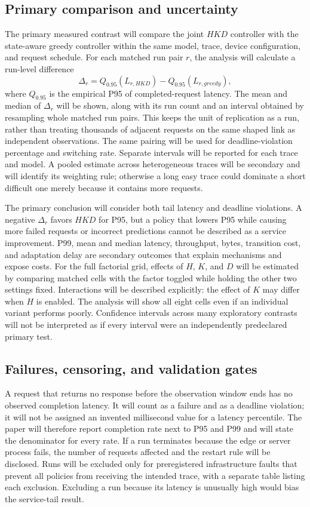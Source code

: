 \documentclass[10pt,a4paper,twocolumn]{article}
\begin{document}
\subsection{Primary comparison and uncertainty}
The primary measured contrast will compare the joint $HKD$ controller with the state-aware greedy controller within the same model, trace, device configuration, and request schedule. For each matched run pair $r$, the analysis will calculate a run-level difference
\begin{equation}
\Delta_r=Q_{0.95}(L_{r,HKD})-Q_{0.95}(L_{r,greedy}),
\label{eq:paired}
\end{equation}
where $Q_{0.95}$ is the empirical P95 of completed-request latency. The mean and median of $\Delta_r$ will be shown, along with its run count and an interval obtained by resampling whole matched run pairs. This keeps the unit of replication as a run, rather than treating thousands of adjacent requests on the same shaped link as independent observations. The same pairing will be used for deadline-violation percentage and switching rate. Separate intervals will be reported for each trace and model. A pooled estimate across heterogeneous traces will be secondary and will identify its weighting rule; otherwise a long easy trace could dominate a short difficult one merely because it contains more requests.

The primary conclusion will consider both tail latency and deadline violations. A negative $\Delta_r$ favors $HKD$ for P95, but a policy that lowers P95 while causing more failed requests or incorrect predictions cannot be described as a service improvement. P99, mean and median latency, throughput, bytes, transition cost, and adaptation delay are secondary outcomes that explain mechanisms and expose costs. For the full factorial grid, effects of $H$, $K$, and $D$ will be estimated by comparing matched cells with the factor toggled while holding the other two settings fixed. Interactions will be described explicitly: the effect of $K$ may differ when $H$ is enabled. The analysis will show all eight cells even if an individual variant performs poorly. Confidence intervals across many exploratory contrasts will not be interpreted as if every interval were an independently predeclared primary test.

\subsection{Failures, censoring, and validation gates}
A request that returns no response before the observation window ends has no observed completion latency. It will count as a failure and as a deadline violation; it will not be assigned an invented millisecond value for a latency percentile. The paper will therefore report completion rate next to P95 and P99 and will state the denominator for every rate. If a run terminates because the edge or server process fails, the number of requests affected and the restart rule will be disclosed. Runs will be excluded only for preregistered infrastructure faults that prevent all policies from receiving the intended trace, with a separate table listing each exclusion. Excluding a run because its latency is unusually high would bias the service-tail result.
\end{document}
